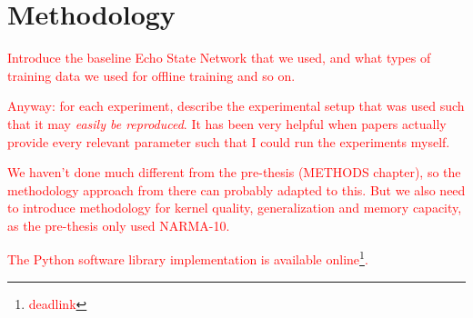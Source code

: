\chapter{Methodology}

\textcolor{red}{
  Introduce the baseline Echo State Network that we used, and what types of
training data we used for offline training and so on.
}

\textcolor{red}{
  Anyway: for each experiment, describe the experimental setup that was used
such that it may \textit{easily be reproduced}. It has been very helpful when
papers actually provide every relevant parameter such that I could run the
experiments myself.
}

\textcolor{red}{
  We haven't done much different from the pre-thesis (METHODS chapter), so the
methodology approach from there can probably adapted to this. But we also need
to introduce methodology for kernel quality, generalization and memory capacity,
as the pre-thesis only used NARMA-10.
}

\textcolor{red}{
  The Python software library implementation is available
online\footnote{\textcolor{red}{deadlink}}.
}

